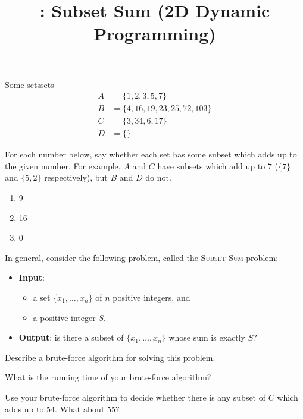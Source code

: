 \documentclass{tufte-handout}
\title{\thecourse: Subset Sum (2D Dynamic Programming)}
\date{}
\begin{document}
\maketitle

\begin{model*}{Some sets}{sets}
  \begin{align*}
    A &= \{ 1, 2, 3, 5, 7 \} \\
    B &= \{ 4, 16, 19, 23, 25, 72, 103 \} \\
    C &= \{ 3, 34, 6, 17 \} \\
    D &= \{ \}
  \end{align*}
\end{model*}

\begin{questions}
\item For each number below, say whether each set has some subset
  which adds up to the given number.  For example, $A$ and $C$ have
  subsets which add up to $7$ ($\{7\}$ and $\{5,2\}$ respectively),
  but $B$ and $D$ do not.
  \begin{enumerate}[label=(\alph*)]
  \item 9
  \item 16
  \item 0
  \end{enumerate}
\end{questions}

In general, consider the following problem, called the \textsc{Subset Sum}
problem:
\begin{itemize}
\item \textbf{Input}:
  \begin{itemize}
  \item a set $\{x_1, \dots, x_n\}$ of $n$ positive
    integers, and
  \item a positive integer $S$.
  \end{itemize}

\item \textbf{Output}: is there a subset of $\{x_1, \dots, x_n\}$
  whose sum is exactly $S$?
\end{itemize}

\begin{questions}
\item Describe a brute-force algorithm for solving this problem.
\item \label{q:brute} What is the running time of your brute-force
  algorithm?
\item Use your brute-force algorithm to decide whether there is any
  subset of $C$ which adds up to $54$.  What about $55$?
\end{questions}
\end{document}
